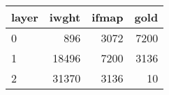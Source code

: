 \begin{tabular}{lrrr}
\toprule
layer &  iwght &  ifmap &  gold \\
\midrule
    0 &    896 &   3072 &  7200 \\
    1 &  18496 &   7200 &  3136 \\
    2 &  31370 &   3136 &    10 \\
\bottomrule
\end{tabular}
